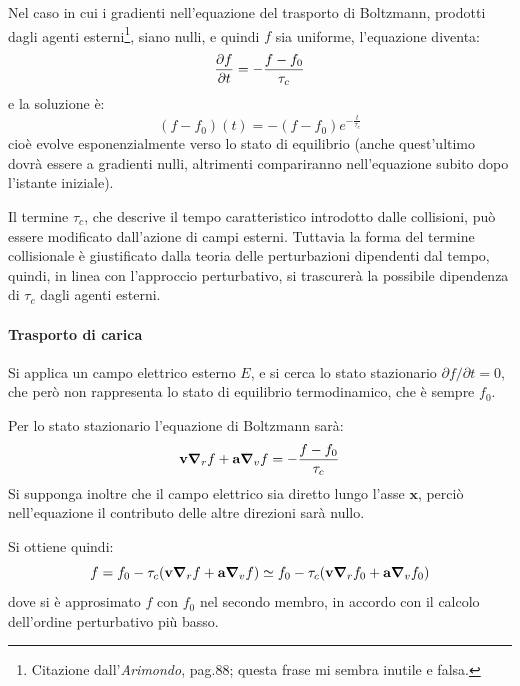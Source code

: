 \begin{es}
	Nel caso in cui i gradienti nell'equazione del trasporto di Boltzmann, prodotti dagli agenti esterni\footnote{Citazione dall'\textit{Arimondo}, pag.88; questa frase mi sembra inutile e falsa.}, siano nulli, e quindi $ f $ sia uniforme, l'equazione diventa:
	\begin{equation*}
	\frac{\partial {f}}{\partial {t}} = -  \frac{f - f_0}{\tau_c}
	\end{equation*}
	e la soluzione è:
	\begin{equation*}
	(f-f_0)(t) = -  (f - f_0)e^{-\frac{t}{\tau_c}}
	\end{equation*}
	cioè evolve esponenzialmente verso lo stato di equilibrio (anche quest'ultimo dovrà essere a gradienti nulli, altrimenti compariranno nell'equazione subito dopo l'istante iniziale).
\end{es}

Il termine $ \tau_c $, che descrive il tempo caratteristico introdotto dalle collisioni, può essere modificato dall'azione di campi esterni. Tuttavia la forma del termine collisionale è giustificato dalla teoria delle perturbazioni dipendenti dal tempo, quindi, in linea con l'approccio perturbativo, si trascurerà la possibile dipendenza di $ \tau_c $ dagli agenti esterni.

\paragraph{Trasporto di carica} Si applica un campo elettrico esterno $ E $, e si cerca lo stato stazionario $ \partial f / \partial t = 0 $, che però non rappresenta lo stato di equilibrio termodinamico, che è sempre $ f_0 $.

Per lo stato stazionario l'equazione di Boltzmann sarà:
\begin{equation*}
\textbf{v} \grad_r f + \textbf{a} \grad_v f =  -  \frac{f - f_0}{\tau_c}
\end{equation*}
Si supponga inoltre che il campo elettrico sia diretto lungo l'asse $ \textbf{x} $, perciò nell'equazione il contributo delle altre direzioni sarà nullo.

Si ottiene quindi:
\begin{equation*}
f = f_0 - \tau_c(\textbf{v} \grad_r f + \textbf{a} \grad_v f) \simeq f_0 - \tau_c(\textbf{v} \grad_r f_0 + \textbf{a} \grad_v f_0)
\end{equation*}
dove si è approsimato $ f $ con $ f_0 $ nel secondo membro, in accordo con il calcolo dell'ordine perturbativo più basso.

